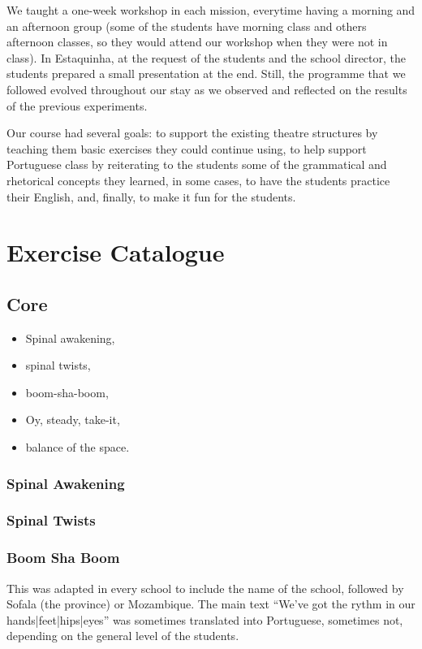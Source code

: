 \documentclass[article,twoside]{memoir}
\begin{document}
We taught a one-week workshop in each mission, everytime having a morning and
an afternoon group (some of the students have morning class and others
afternoon classes, so they would attend our workshop when they were not in
class). In Estaquinha, at the request of the students and the school director,
the students prepared a small presentation at the end. Still, the programme
that we followed evolved throughout our stay as we observed and reflected on
the results of the previous experiments.

Our course had several goals: to support the existing theatre structures by
teaching them basic exercises they could continue using, to help support
Portuguese class by reiterating to the students some of the grammatical and
rhetorical concepts they learned, in some cases, to have the students practice
their English, and, finally, to make it fun for the students.

\chapter{Exercise Catalogue}
\section{Core}
\begin{itemize}
\item Spinal awakening,
\item spinal twists,
\item boom-sha-boom,
\item Oy, steady, take-it,
\item balance of the space.
\end{itemize}

\subsection{Spinal Awakening}
\subsection{Spinal Twists}
\subsection{Boom Sha Boom}
This was adapted in every school to include the name of the school, followed by
Sofala (the province) or Mozambique. The main text ``We've got the rythm in our
hands|feet|hips|eyes'' was sometimes translated into Portuguese, sometimes not,
depending on the general level of the students.
\end{document}

